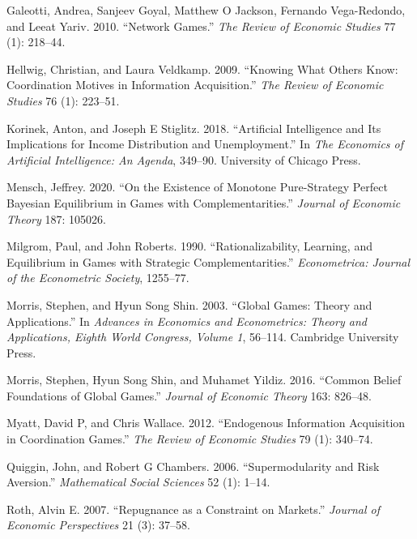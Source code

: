 \documentclass[
]{article}
\newlength{\cslhangindent}
\newenvironment{CSLReferences}[2] %
 {\begin{list}{}{%
  \setlength{\itemindent}{0pt}
  \setlength{\leftmargin}{0pt}
  \setlength{\parsep}{0pt}
  \ifodd #1
   \setlength{\leftmargin}{\cslhangindent}
   \setlength{\itemindent}{-1\cslhangindent}
  \fi
  \setlength{\itemsep}{#2\baselineskip}}}
 {\end{list}}
\theoremstyle{definition}
\theoremstyle{plain}
\theoremstyle{remark}
\begin{document}
\begin{CSLReferences}{1}{0}
Galeotti, Andrea, Sanjeev Goyal, Matthew O Jackson, Fernando
Vega-Redondo, and Leeat Yariv. 2010. {``Network Games.''} \emph{The
Review of Economic Studies} 77 (1): 218--44.

Hellwig, Christian, and Laura Veldkamp. 2009. {``Knowing What Others
Know: Coordination Motives in Information Acquisition.''} \emph{The
Review of Economic Studies} 76 (1): 223--51.

Korinek, Anton, and Joseph E Stiglitz. 2018. {``Artificial Intelligence
and Its Implications for Income Distribution and Unemployment.''} In
\emph{The Economics of Artificial Intelligence: An Agenda}, 349--90.
University of Chicago Press.

Mensch, Jeffrey. 2020. {``On the Existence of Monotone Pure-Strategy
Perfect Bayesian Equilibrium in Games with Complementarities.''}
\emph{Journal of Economic Theory} 187: 105026.

Milgrom, Paul, and John Roberts. 1990. {``Rationalizability, Learning,
and Equilibrium in Games with Strategic Complementarities.''}
\emph{Econometrica: Journal of the Econometric Society}, 1255--77.

Morris, Stephen, and Hyun Song Shin. 2003. {``Global Games: Theory and
Applications.''} In \emph{Advances in Economics and Econometrics: Theory
and Applications, Eighth World Congress, Volume 1}, 56--114. Cambridge
University Press.

Morris, Stephen, Hyun Song Shin, and Muhamet Yildiz. 2016. {``Common
Belief Foundations of Global Games.''} \emph{Journal of Economic Theory}
163: 826--48.

Myatt, David P, and Chris Wallace. 2012. {``Endogenous Information
Acquisition in Coordination Games.''} \emph{The Review of Economic
Studies} 79 (1): 340--74.

Quiggin, John, and Robert G Chambers. 2006. {``Supermodularity and Risk
Aversion.''} \emph{Mathematical Social Sciences} 52 (1): 1--14.

Roth, Alvin E. 2007. {``Repugnance as a Constraint on Markets.''}
\emph{Journal of Economic Perspectives} 21 (3): 37--58.


\end{CSLReferences}
\end{document}
